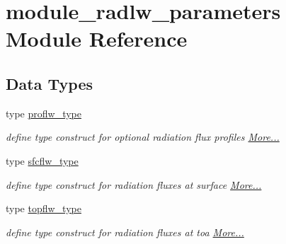 \hypertarget{namespacemodule__radlw__parameters}{}\section{module\+\_\+radlw\+\_\+parameters Module Reference}
\label{namespacemodule__radlw__parameters}
\subsection*{Data Types}
\begin{DoxyCompactItemize}
\item 
type \hyperlink{group__module__radlw__main_structmodule__radlw__parameters_1_1proflw__type}{proflw\+\_\+type}
\begin{DoxyCompactList}\small\item\em define type construct for optional radiation flux profiles  \hyperlink{group__module__radlw__main_structmodule__radlw__parameters_1_1proflw__type}{More...}\end{DoxyCompactList}\item 
type \hyperlink{group__module__radlw__main_structmodule__radlw__parameters_1_1sfcflw__type}{sfcflw\+\_\+type}
\begin{DoxyCompactList}\small\item\em define type construct for radiation fluxes at surface  \hyperlink{group__module__radlw__main_structmodule__radlw__parameters_1_1sfcflw__type}{More...}\end{DoxyCompactList}\item 
type \hyperlink{namespacemodule__radlw__parameters_structmodule__radlw__parameters_1_1topflw__type}{topflw\+\_\+type}
\begin{DoxyCompactList}\small\item\em define type construct for radiation fluxes at toa  \hyperlink{namespacemodule__radlw__parameters_structmodule__radlw__parameters_1_1topflw__type}{More...}\end{DoxyCompactList}\end{DoxyCompactItemize}

